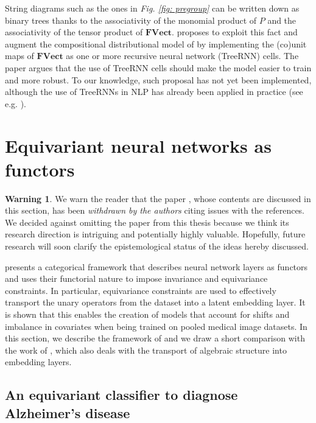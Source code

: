 \documentclass[11pt,a4paper,openright,twoside]{report}
\newcounter{mycounter}
\theoremstyle{plain}
\theoremstyle{definition}
\newtheorem{warning}[mycounter]{Warning}
\begin{document}
String diagrams such as the ones in \textit{Fig. \ref{fig: pregroup}} can be written down as binary trees thanks to the associativity of the monomial product of $P$ and the associativity of the tensor product of $\mathbf{FVect}$. 
\cite{lewis2019compositionality} proposes to exploit this fact and augment the compositional distributional model of \cite{coecke2010mathematical} by implementing the (co)unit maps of $\mathbf{FVect}$ as one or more recursive neural network (TreeRNN) cells. The paper argues that the use of TreeRNN cells should make the model easier to train and more robust. To our knowledge, such proposal has not yet been implemented, although the use of TreeRNNs in NLP has already been applied in practice (see e.g. \cite{ahmed2019improving}).





\section{Equivariant neural networks as functors}

\begin{warning}
  We warn the reader that the paper \cite{chytas2024poolingimagedatasetsmultiple}, whose contents are discussed in this section, has been \textit{withdrawn by the authors} citing issues with the references. We decided against omitting the paper from this thesis because we think its research direction is intriguing and potentially highly valuable. Hopefully, future research will soon clarify the epistemological status of the ideas hereby discussed.
\end{warning}

\cite{chytas2024poolingimagedatasetsmultiple} presents a categorical framework that describes neural network layers as functors and uses their functorial nature to impose invariance and equivariance constraints. In particular, equivariance constraints are used to effectively transport the unary operators from the dataset into a latent embedding layer. It is shown that this enables the creation of models that account for shifts and imbalance in covariates when being trained on pooled medical image datasets. In this section, we describe the framework of \cite{chytas2024poolingimagedatasetsmultiple} and we draw a short comparison with the work of \cite{pfrommer2024transport}, which also deals with the transport of algebraic structure into embedding layers.


\subsection{An equivariant classifier to diagnose Alzheimer's disease}
\end{document}
